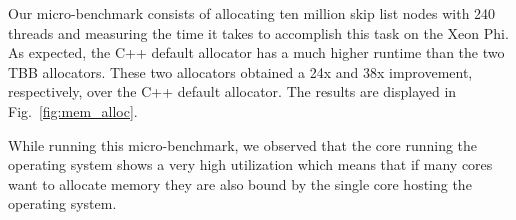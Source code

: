 Our micro-benchmark consists of allocating ten million skip list nodes with 240 threads and measuring the time it takes to accomplish this task on the Xeon Phi.
As expected, the C++ default allocator has a much higher runtime than the two TBB allocators. These two allocators obtained a 24x and 38x improvement, respectively, over the C++ default allocator. The results are displayed in Fig.~\ref{fig:mem_alloc}.

While running this micro-benchmark, we observed that the core running the operating system shows a very high utilization which means that if many cores want to allocate memory they are also bound by the single core hosting the operating system.
